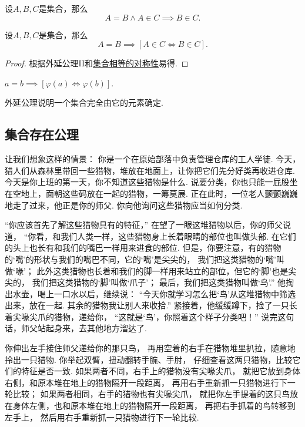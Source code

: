 \begin{axiom}[外延公理II]
设\(A,B,C\)是集合，那么\[
	A=B \land A \in C \implies B \in C.
\]
\end{axiom}

\begin{property}
设\(A,B,C\)是集合，那么\[
	A=B \implies [A \in C \iff B \in C].
\]
\begin{proof}
根据外延公理II和\hyperref[item:集合论.集合相等的对称性]{集合相等的对称性}易得.
\end{proof}
\end{property}

\begin{theorem}
\(a=b \implies [\varphi(a)\iff\varphi(b)]\).
\end{theorem}

外延公理说明一个集合完全由它的元素确定.


\subsection{集合存在公理}
让我们想象这样的情景：
你是一个在原始部落中负责管理仓库的工人学徒.
今天，猎人们从森林里带回一些猎物，堆放在地面上，让你把它们先分好类再收进仓库.
今天是你上班的第一天，你不知道这些猎物是什么.
说要分类，你也只能一屁股坐在空地上，面朝这些码放在一起的猎物，一筹莫展.
正在此时，一位老人颤颤巍巍地走了过来，他正是你的师父.
你向他询问这些猎物应当如何分类.

“你应该首先了解这些猎物具有的特征，”
在望了一眼这堆猎物以后，你的师父说道，
“你看，和我们人类一样，这些猎物身上长着眼睛的部位也叫做头部.
在它们的头上也长有和我们的嘴巴一样用来进食的部位.
但是，你要注意，有的猎物的‘嘴’的形状与我们的嘴巴不同，它的‘嘴’是尖尖的，
我们把这类猎物的‘嘴’叫做‘喙’；
此外这类猎物也长着和我们的脚一样用来站立的部位，但它的‘脚’也是尖尖的，
我们把这类猎物的‘脚’叫做‘爪子’；
最后，我们把这类猎物叫做‘鸟’.”
他掏出水壶，喝上一口水以后，继续说：
“今天你就学习怎么把‘鸟’从这堆猎物中筛选出来，放在一起.
其余的猎物我让别人来收拾.”
紧接着，他缓缓蹲下，捡了一只长着尖喙尖爪的猎物，递给你，
“这就是‘鸟’，你照着这个样子分类吧！”
说完这句话，师父站起身来，去其他地方溜达了.

你伸出左手接住师父递给你的那只鸟，
再用空着的右手在猎物堆里扒拉，随意地拎出一只猎物.
你举起双臂，扭动翻转手腕、手肘，
仔细查看这两只猎物，比较它们的特征是否一致.
如果两者不同，右手上的猎物没有尖喙尖爪，
就把它放到身体右侧，和原本堆在地上的猎物隔开一段距离，
再用右手重新抓一只猎物进行下一轮比较；
如果两者相同，右手的猎物也有尖喙尖爪，
就把你左手提着的这只鸟放在身体左侧，也和原本堆在地上的猎物隔开一段距离，
再把右手抓着的鸟转移到左手上，
然后用右手重新抓一只猎物进行下一轮比较.

